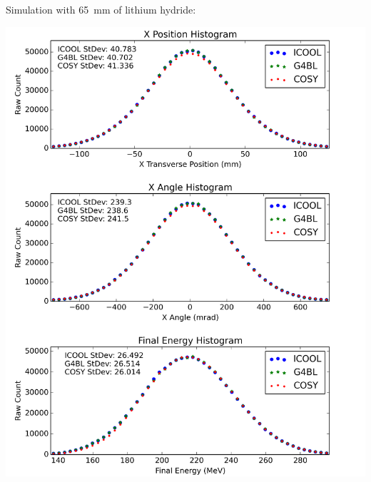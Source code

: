 \documentclass[portrait,a0paper,fontscale=0.285]{baposter} %
\begin{document}
\begin{poster}
{Simulation with 65~mm of lithium hydride:

\begin{center}
\includegraphics[width=\textwidth]{Figures/MICE_LH}
\end{center}

}
\end{poster}
\end{document}
